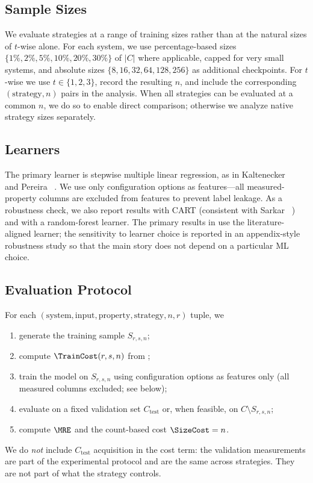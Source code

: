 \subsection{Sample Sizes}
\label{subsec:sizes}

We evaluate strategies at a range of training sizes rather than at the natural
sizes of $t$-wise alone. For each system, we use percentage-based sizes
$\{1\%,2\%,5\%,10\%,20\%,30\%\}$ of $|C|$ where applicable, capped for very
small systems, and absolute sizes
$\{8,16,32,64,128,256\}$ as additional checkpoints. For $t$-wise we use
$t\in\{1,2,3\}$, record the resulting $n$, and include the corresponding
$(\text{strategy},n)$ pairs in the analysis. When all strategies can be
evaluated at a common $n$, we do so to enable direct comparison; otherwise we
analyze native strategy sizes separately.

\subsection{Learners}
\label{subsec:learners}

The primary learner is stepwise multiple linear regression, as in
Kaltenecker \etal~\cite{kaltenecker2019} and Pereira
\etal~\cite{pereira2020}. We use only configuration options as features---all
measured-property columns are excluded from features to prevent label
leakage. As a robustness check, we also report results with CART (consistent
with Sarkar \etal~\cite{sarkar2015}) and with a random-forest learner. The
primary results in  use the literature-aligned learner; the
sensitivity to learner choice is reported in an appendix-style robustness
study so that the main story does not depend on a particular ML choice.

\subsection{Evaluation Protocol}
\label{subsec:protocol}

For each $(\text{system},\text{input},\text{property},\text{strategy},n,r)$
tuple, we
\begin{enumerate}
    \item generate the training sample $S_{r,s,n}$;
    \item compute $\TrainCost(r,s,n)$ from ;
    \item train the model on $S_{r,s,n}$ using configuration options as
    features only (all measured columns excluded; see below);
    \item evaluate on a fixed validation set $C_{\text{test}}$ or, when
    feasible, on $C\setminus S_{r,s,n}$;
    \item compute $\MRE$ and the count-based cost $\SizeCost=n$.
\end{enumerate}
We do \emph{not} include $C_{\text{test}}$ acquisition in the cost term: the
validation measurements are part of the experimental protocol and are the
same across strategies. They are not part of what the strategy controls.

